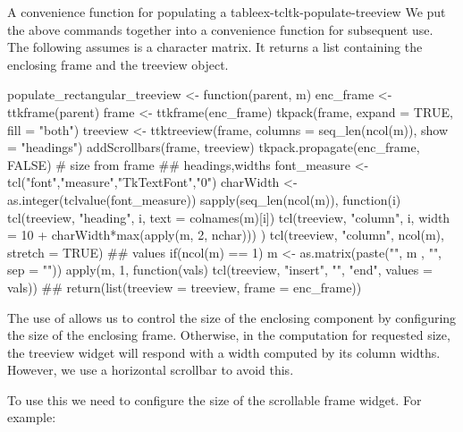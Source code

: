 \begin{example}{A convenience function for populating a table}{ex-tcltk-populate-treeview}
  We put the above commands together into a convenience function for
  subsequent use. The following assumes  is a character
  matrix. It returns a list containing the enclosing frame and the
  treeview object.  
\begin{Schunk}
\begin{Sinput}
 populate_rectangular_treeview <- function(parent, m) {
   enc_frame <- ttkframe(parent)
   frame <- ttkframe(enc_frame)
   tkpack(frame, expand = TRUE, fill = "both")
   treeview <- ttktreeview(frame,
                     columns = seq_len(ncol(m)),
                     show = "headings")
   addScrollbars(frame, treeview)
   tkpack.propagate(enc_frame, FALSE)    # size from frame
   ## headings,widths
   font_measure <- tcl("font","measure","TkTextFont","0")
   charWidth <- as.integer(tclvalue(font_measure))
   sapply(seq_len(ncol(m)), function(i) {
     tcl(treeview, "heading", i, text = colnames(m)[i])
     tcl(treeview, "column", i, 
         width = 10 + charWidth*max(apply(m, 2, nchar)))
   })
   tcl(treeview, "column", ncol(m), stretch = TRUE)
   ## values
   if(ncol(m) == 1)  m <- as.matrix(paste("{", m , "}", sep = ""))
   apply(m, 1, function(vals) 
     tcl(treeview, "insert", "", "end", values = vals))
   ##
   return(list(treeview = treeview, frame = enc_frame))
 }
\end{Sinput}
\end{Schunk}
%
The use of  allows us to control the size of
the enclosing component by configuring the size of the enclosing
frame. Otherwise, in the computation for requested size, the treeview
widget will respond with a width computed by its column
widths. However, we use a horizontal scrollbar to avoid this.

To use this we need to configure the size of the scrollable frame
widget. For example:
\begin{Schunk}
\end{Schunk}

\end{example}



